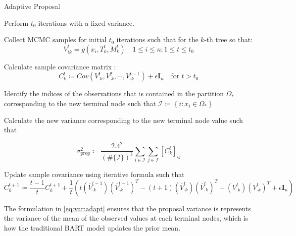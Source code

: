 \documentclass{amsart}
\begin{document}
\begin{algorithm}[H]
	\caption{Adaptive Proposal}\label{alg:ada:prop}
	\begin{algorithmic}[1]
		\State Perform $t_0$ iterations with a fixed variance.
		
		\State Collect MCMC samples for initial $t_0$ iterations such that for the $k$-th tree so that:
		\begin{equation*}
			V_{ik}^{t} = g(x_i,T_k^{t},M_k^{t})\quad 1\le i \le n; 1\le t \le t_0
		\end{equation*}
		
		\State Calculate sample covariance matrix :
		\begin{equation*}
			C_k^{t} \coloneqq Cov\left(V_{\cdot k}^{1},V_{\cdot k}^{2},\cdots,V_{\cdot k}^{t-1}\right) + \epsilon\mathbf{I}_n \quad \text{for } t>t_0
		\end{equation*}
		
		\State Identify the indices of the observations that is contained in the partition $\Omega_\ast$ corresponding to the new terminal node such that $\mathcal{I}\coloneqq\left\{i:x_i \in \Omega_\ast\right\}$
		
		\State Calculate the new variance corresponding to the new terminal node value such that
		
		\begin{equation}\label{eq:var:adapt}
			\sigma_{\text{prop}}^2 \coloneqq \frac{2.4^2}{(\#\{\mathcal{I}\})^3}\sum_{i\in\mathcal{I}}\sum_{j\in\mathcal{I}}\left[C_k^{t}\right]_{ij}
		\end{equation}
		
		\EndFor
		
		\State Update sample covariance using iterative formula such that
		\begin{equation*}
			C_k^{t+1} \coloneqq \frac{t-1}{t} C_k^{t+1} + \frac{1}{t}\left(t \left(\overline{V}_{\cdot k}^{t-1}\right)\left(\overline{V}_{\cdot k}^{t-1}\right)^T - (t+1)\left(\overline{V}_{\cdot k}^{t}\right)\left(\overline{V}_{\cdot k}^{t}\right)^T + \left({V}_{\cdot k}^{t}\right)\left({V}_{\cdot k}^{t}\right)^T + \epsilon\mathbf{I}_n\right)
		\end{equation*}
	\end{algorithmic}
\end{algorithm}
The formulation in \cref{eq:var:adapt} ensures that the proposal variance is represents the variance of the mean of the observed values at each terminal nodes, which is how the traditional BART model updates the prior mean.
\end{document}
